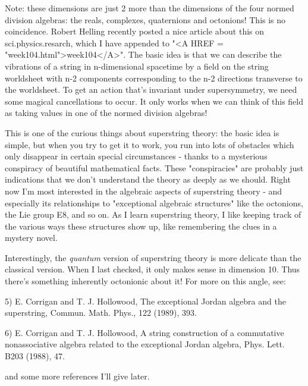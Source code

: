 Note: these dimensions are just 2 more than the dimensions of the four
normed division algebras: the reals, complexes, quaternions and
octonions!  This is no coincidence.  Robert Helling recently posted a
nice article about this on sci.physics.resarch, which I have appended to
"<A HREF = "week104.html">week104</A>".  The basic idea is that we can describe the vibrations of a
string in n-dimensional spacetime by a field on the string worldsheet
with n-2 components corresponding to the n-2 directions transverse to
the worldsheet.  To get an action that's invariant under supersymmetry,
we need some magical cancellations to occur.  It only works when we can
think of this field as taking values in one of the normed division
algebras!

This is one of the curious things about superstring theory: the
basic idea is simple, but when you try to get it to work, you run into
lots of obstacles which only disappear in certain special circumstances
- thanks to a mysterious conspiracy of beautiful mathematical facts.
These "conspiracies" are probably just indications that we
don't understand the theory as deeply as we should.  Right now I'm most
interested in the algebraic aspects of superstring theory - and
especially its relationships to "exceptional algebraic
structures" like the octonions, the Lie group E8, and so on.  As I
learn superstring theory, I like keeping track of the various ways these
structures show up, like remembering the clues in a mystery novel.

Interestingly, the \emph{quantum} version of superstring theory is more
delicate than the classical version.  When I last checked, it only makes
sense in dimension 10.  Thus there's something inherently octonionic
about it!  For more on this angle, see:

5) E. Corrigan and T. J. Hollowood, The exceptional Jordan algebra and 
the superstring, Commun. Math. Phys., 122 (1989), 393.

6) E. Corrigan and T. J. Hollowood, A string construction of a
commutative nonassociative algebra related to the exceptional Jordan
algebra, Phys. Lett. B203 (1988), 47.

and some more references I'll give later.

